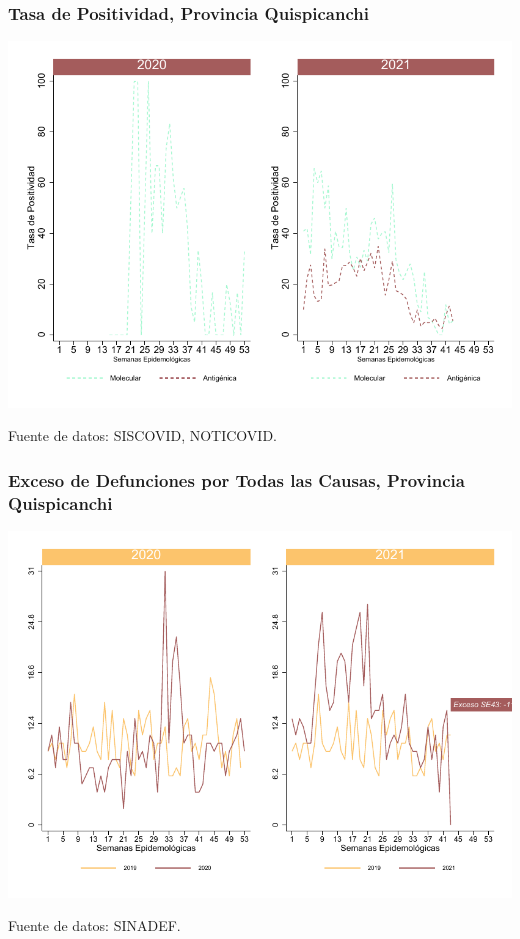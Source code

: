 \documentclass[xcolor=table]{beamer}
\begin{document}
\begin{frame}
	\frametitle{Tasa de Positividad, Provincia Quispicanchi}
	\vspace{-.5cm}
	\begin{center}
		\includegraphics[width=0.8\linewidth, trim={0cm .5cm 0cm 0.2cm},clip]{../figuras/positividad_20_21_12.pdf}
	\end{center}
	{\tiny Fuente de datos: SISCOVID, NOTICOVID.}
\end{frame}

\begin{frame}
	\frametitle{Exceso de Defunciones por Todas las Causas, Provincia Quispicanchi}
	\vspace{-.5cm}
	\begin{center}
		\includegraphics[width=0.8\linewidth, trim={0cm .5cm 0cm 0.2cm},clip]{../figuras/exceso_12.pdf}
	\end{center}
	{\tiny Fuente de datos: SINADEF.}
	
	\hyperlink{indicadores_provinciales}{}
\end{frame}
\end{document}
